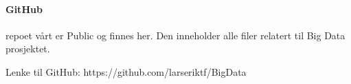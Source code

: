 \paragraph{GitHub}
repoet vårt er Public og finnes her. Den inneholder alle filer relatert til Big Data prosjektet.

Lenke til GitHub: https://github.com/larseriktf/BigData
